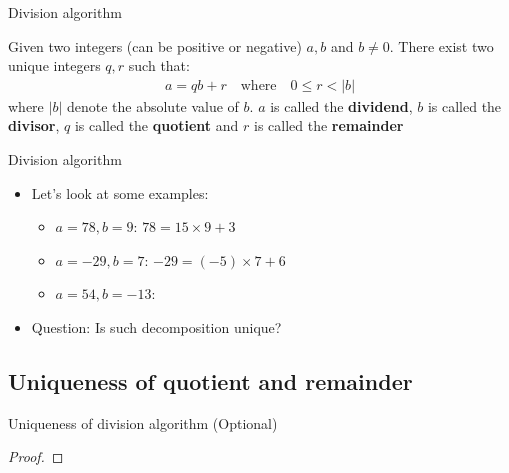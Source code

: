 \documentclass[10pt,xcolor={table,dvipsnames},t]{beamer}
\begin{document}
\begin{frame}{Division algorithm}
  \begin{theorem}
    Given two integers (can be positive or negative) $a,b$ and $b\neq 0$. There exist two unique integers $q,r$ such that:
    \begin{align*}
      a = qb + r \quad \text{where} \quad 0\leq r < |b|
    \end{align*}
    where $|b|$ denote the absolute value of $b$. $a$ is called the \textbf{dividend}, $b$ is called the \textbf{divisor}, $q$ is called the \textbf{quotient} and $r$ is called the \textbf{remainder}  
  \end{theorem}
\end{frame}

\begin{frame}{Division algorithm}
  \begin{itemize}
    \item Let's look at some examples:
    \begin{itemize}
      \item $a=78, b=9$: $78 = 15\times 9 + 3$
      \item $a=-29, b=7$: $-29 = (-5) \times 7+ 6$
      \item $a=54, b=-13$: 
    \end{itemize}
    \item Question: Is such decomposition unique?
  \end{itemize}
\end{frame}

\subsection{Uniqueness of quotient and remainder}
\begin{frame}{Uniqueness of division algorithm (Optional)}
  \begin{proof}
  \end{proof}
\end{frame}
\end{document}
